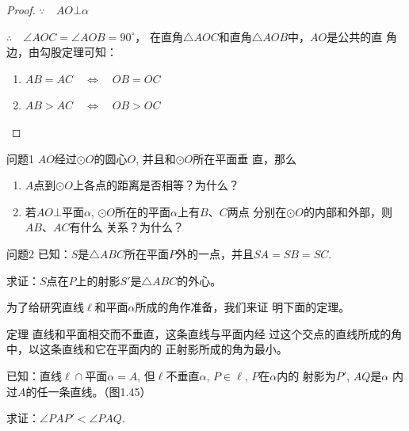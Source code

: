 \begin{proof}
$\because\quad AO\bot\alpha$

$\therefore \quad \angle AOC=\angle AOB=90^{\circ}$，
在直角$\triangle AOC$和直角$\triangle AOB$中，$AO$是公共的直
角边，由勾股定理可知：
\begin{enumerate}
  \item $AB=AC\quad \Longleftrightarrow \quad OB=OC$
  \item $AB>AC\quad \Longleftrightarrow \quad OB>OC$
\end{enumerate}
\end{proof}

\begin{blk}
  {问题1} $AO$经过$\odot O$的圆心$O$, 并且和$\odot O$所在平面垂
直，那么
\begin{enumerate}
  \item $A$点到$\odot O$上各点的距离是否相等？为什么？
  \item 若$AO\bot$平面$\alpha$, $\odot O$所在的平面$\alpha$上有$B$、$C$两点
分别在$\odot O$的内部和外部，则$AB$、$AC$有什么
关系？为什么？
\end{enumerate}
\end{blk}


\begin{blk}
  {问题2} 已知：$S$是$\triangle ABC$所在平面$P$外的一点，并且$SA
=SB=SC$.

求证：$S$点在$P$上的射影$S'$是$\triangle ABC$的外心。
\end{blk}

为了给研究直线$\ell$和平面$\alpha$所成的角作准备，我们来证
明下面的定理。

\begin{blk}
  {定理} 直线和平面相交而不垂直，这条直线与平面内经
过这个交点的直线所成的角中，以这条直线和它在平面内的
正射影所成的角为最小。
\end{blk}

已知：直线$\ell\cap$平面$\alpha=A$, 但$\ell$不垂直$\alpha$, $P\in\ell$, $P$在$\alpha$内的
射影为$P'$, $AQ$是$\alpha$
内过$A$的任一条直线。（图1.45）

求证：$\angle PAP'<\angle PAQ$.

\begin{figure}[htp]
  \centering
{}
  \caption{}
\end{figure}

